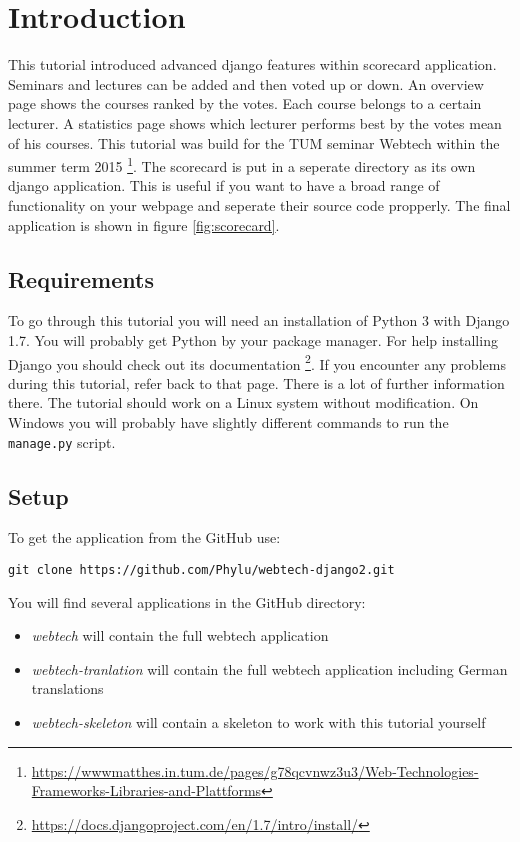 \section{Introduction}

This tutorial introduced advanced django features within scorecard application. Seminars and lectures can be added and then voted up or down. An overview page shows the courses ranked by the votes. Each course belongs to a certain lecturer. A statistics page shows which lecturer performs best by the votes mean of his courses. This tutorial was build for the TUM seminar Webtech within the summer term 2015 \footnote{\url{https://wwwmatthes.in.tum.de/pages/g78qcvnwz3u3/Web-Technologies-Frameworks-Libraries-and-Plattforms}}. The scorecard is put in a seperate directory as its own django application. This is useful if you want to have a broad range of functionality on your webpage and seperate their source code propperly. The final application is shown in figure \ref{fig:scorecard}.


\subsection{Requirements}

To go through this tutorial you will need an installation of Python 3 with Django 1.7. You will probably get Python by your package manager. For help installing Django you should check out its documentation \footnote{\url{https://docs.djangoproject.com/en/1.7/intro/install/}}. If you encounter any problems during this tutorial, refer back to that page. There is a lot of further information there. The tutorial should work on a Linux system without modification. On Windows you will probably have slightly different commands to run the \lstinline|manage.py| script.

\subsection{Setup}

To get the application from the GitHub use:
\begin{lstlisting}[style=Bash, caption=Clone application, label=lst:clone_app]
git clone https://github.com/Phylu/webtech-django2.git
\end{lstlisting}

You will find several applications in the GitHub directory:
\begin{itemize}
 \item \emph{webtech} will contain the full webtech application
 \item \emph{webtech-tranlation} will contain the full webtech application including German translations
 \item \emph{webtech-skeleton} will contain a skeleton to work with this tutorial yourself
\end{itemize}

